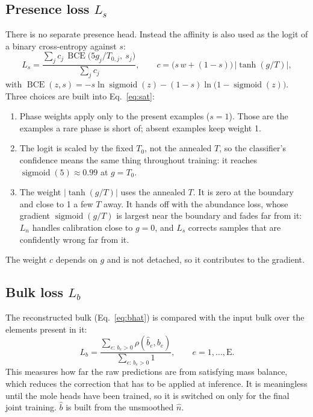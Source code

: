 \documentclass[11pt]{article}
\DeclareMathOperator{\BCE}{BCE}
\begin{document}
\subsection{Presence loss $L_s$}
There is no separate presence head. Instead the affinity is also used as the logit of a
binary cross-entropy against $s$:
\begin{equation}
  L_s = \frac{\sum_j c_j\, \BCE\!\big(5g_j/T_{0,j},\ s_j\big)}{\sum_j c_j},
  \qquad
  c = \big(s\,w + (1-s)\big)\,\big|\tanh(g/T)\big|,
  \label{eq:sat}
\end{equation}
with $\BCE(z,s) = -s\ln\operatorname{sigmoid}(z) - (1-s)\ln\big(1-\operatorname{sigmoid}(z)\big)$.
Three choices are built into Eq.~\eqref{eq:sat}:
\begin{enumerate}[nosep]
  \item Phase weights apply only to the present examples ($s=1$). Those are the examples a
        rare phase is short of; absent examples keep weight 1.
  \item The logit is scaled by the fixed $T_0$, not the annealed $T$, so the classifier's
        confidence means the same thing throughout training: it reaches
        $\operatorname{sigmoid}(5) \approx 0.99$ at $g = T_0$.
  \item The weight $|\tanh(g/T)|$ uses the annealed $T$. It is zero at the boundary and
        close to 1 a few $T$ away. It hands off with the abundance loss, whose gradient
        $\operatorname{sigmoid}(g/T)$ is largest near the boundary and fades far from it:
        $L_n$ handles calibration close to $g=0$, and $L_s$ corrects samples that are
        confidently wrong far from it.
\end{enumerate}
The weight $c$ depends on $g$ and is not detached, so it contributes to the gradient.

\subsection{Bulk loss $L_b$}
The reconstructed bulk (Eq.~\ref{eq:bhat}) is compared with the input bulk over the
elements present in it:
\begin{equation}
  L_b = \frac{\sum_{e:\, b_e > 0} \rho(\hat b_e, b_e)}{\sum_{e:\, b_e > 0} 1},
  \qquad e = 1,\dots,\text{E}.
\end{equation}
This measures how far the raw predictions are from satisfying mass balance, which reduces
the correction that has to be applied at inference. It is meaningless until the mole heads
have been trained, so it is switched on only for the final joint training. $\hat b$ is
built from the unsmoothed $\hat n$.
\end{document}
